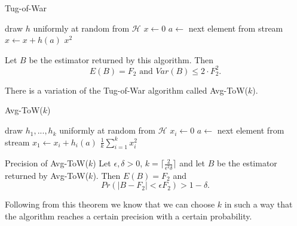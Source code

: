 \documentclass[english]{panikzettel}
\begin{document}
\begin{halfboxl}
\vspace{-\baselineskip}
\begin{algo}{Tug-of-War}
{
\begin{algorithmic}[1]
  \State draw $h$ uniformly at random from $\mathcal{H}$
  \State $x\leftarrow 0$
    \State $a\leftarrow $ next element from stream
    \State $x\leftarrow x + h(a)$
  \EndWhile
  \State \Return $x^2$
\end{algorithmic}
}
\end{algo}
\end{halfboxl}
\begin{halfboxr}
\vspace{-\baselineskip}
Let $B$ be the estimator returned by this algorithm. Then
\[
E(B)=F_2 \text{ and } Var(B)\leq 2\cdot F_2^2.
\]
\end{halfboxr}

There is a variation of the Tug-of-War algorithm called Avg-ToW($k$).

\begin{halfboxl}
\vspace{-\baselineskip}
	\begin{algo}{Avg-ToW($k$)}
	{
	\begin{algorithmic}[1]
	  \State draw $h_1,...,h_k$ uniformly at random from $\mathcal{H}$
	    \State $x_i\leftarrow 0$
	  \EndFor
	    \State $a\leftarrow $ next element from stream
	      \State $x_1\leftarrow x_i + h_i(a)$
	    \EndFor
	  \EndWhile
	  \State \Return $\frac{1}{k}\sum_{i=1}^k x_i^2$
	\end{algorithmic}
	}
	\end{algo}
\end{halfboxl}
\begin{halfboxr}
\vspace{-\baselineskip}
\begin{theo}{Precision of Avg-ToW($k$)}
Let $\epsilon,\delta>0$, $k= \lceil \frac{2}{\epsilon^2\delta} \rceil$ and let $B$ be the estimator returned by Avg-ToW($k$). Then $E(B)=F_2$ and
\[
Pr(|B-F_2| < \epsilon F_2)>1-\delta.
\]
\end{theo}
Following from this theorem we know that we can choose $k$ in such a way that the algorithm reaches a certain precision with a certain probability.
\end{halfboxr}
\end{document}
